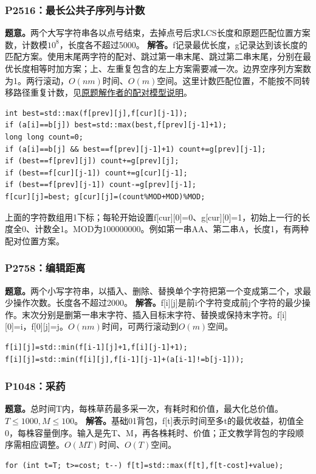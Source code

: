 \subsubsection{P2516：最长公共子序列与计数}
\textbf{题意。}两个大写字符串各以点号结束，去掉点号后求LCS长度和原题匹配位置方案数，计数模$10^8$，长度各不超过5000。
\textbf{解答。}f记录最优长度，g记录达到该长度的匹配方案。使用末尾两字符的配对、跳过第一串末尾、跳过第二串末尾，分别在最优长度相等时加方案；上、左重复包含的左上方案需要减一次。边界空序列方案数为1。两行滚动，$O(nm)$时间、$O(m)$空间。这里计数匹配位置，不能按不同转移路径重复计数，见\href{https://www.luogu.com.cn/article/dsndm32n}{原题解作者的配对模型说明}。
\begin{lstlisting}
int best=std::max(f[prev][j],f[cur][j-1]);
if (a[i]==b[j]) best=std::max(best,f[prev][j-1]+1);
long long count=0;
if (a[i]==b[j] && best==f[prev][j-1]+1) count+=g[prev][j-1];
if (best==f[prev][j]) count+=g[prev][j];
if (best==f[cur][j-1]) count+=g[cur][j-1];
if (best==f[prev][j-1]) count-=g[prev][j-1];
f[cur][j]=best; g[cur][j]=(count%MOD+MOD)%MOD;
\end{lstlisting}
上面的字符数组用1下标；每轮开始设置f[cur][0]=0、g[cur][0]=1，初始上一行的长度全0、计数全1。MOD为100000000。例如第一串AA、第二串A，长度1，有两种配对位置方案。

\subsubsection{P2758：编辑距离}
\textbf{题意。}两个小写字符串，以插入、删除、替换单个字符把第一个变成第二个，求最少操作次数。长度各不超过2000。
\textbf{解答。}f[i][j]是前i个字符变成前j个字符的最少操作。末次分别是删第一串末字符、插入目标末字符、替换或保持末字符。f[i][0]=i，f[0][j]=j。$O(nm)$时间，可两行滚动到$O(m)$空间。
\begin{lstlisting}
f[i][j]=std::min(f[i-1][j]+1,f[i][j-1]+1);
f[i][j]=std::min(f[i][j],f[i-1][j-1]+(a[i-1]!=b[j-1]));
\end{lstlisting}

\subsubsection{P1048：采药}
\textbf{题意。}总时间T内，每株草药最多采一次，有耗时和价值，最大化总价值。$T\le1000,M\le100$。
\textbf{解答。}基础01背包，f[t]表示时间至多t的最优收益，初值全0，每株容量倒序。输入是先T、M，再各株耗时、价值；正文教学背包的字段顺序需相应调整。$O(MT)$时间、$O(T)$空间。
\begin{lstlisting}
for (int t=T; t>=cost; t--) f[t]=std::max(f[t],f[t-cost]+value);
\end{lstlisting}

